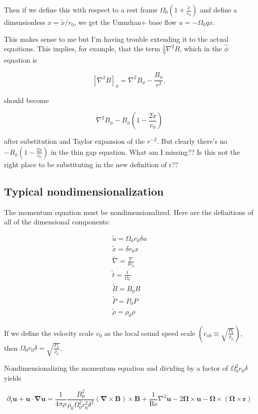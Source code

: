 \documentclass{paper}
\newcommand{\beq}{\begin{equation}}
\newcommand{\eeq}{\end{equation}}
\newcommand\reye{\mathrm{Re}}
\begin{document}
Then if we define this with respect to a rest frame $\Omega_0 \left(1 + \frac{\widetilde{x}}{r_0}\right)$ and define a dimensionless $x = \widetilde{x}/r_0$, we get the Umurhan+ base flow $u = - \Omega_0 q x$. 

This makes sense to me but I'm having trouble extending it to the actual equations. This implies, for example, that the term $\frac{1}{\eta} \nabla^2 B$, which in the $\hat{\phi}$ equation is

\beq
\left[\nabla^2 B\right]_\phi = \nabla^2 B_\phi - \frac{B_\phi}{r^2},
\eeq

should become 

\beq
\nabla^2 B_\phi - B_\phi \left(1 - \frac{2 \widetilde{x}}{r_0}\right)
\eeq

after substitution and Taylor expansion of the $r^{-2}$. But clearly there's no $- B_\phi \left(1 - \frac{2 \widetilde{x}}{r_0}\right)$ in the thin gap equation. What am I missing?? Is this not the right place to be substituting in the new definition of r??

\subsection{Typical nondimensionalization}
The momentum equation must be nondimensionalized. Here are the definitions of all of the dimensional components: 

\begin{equation}
\begin{multlined}
\widetilde{u} = \Omega_0 r_0 \delta u \\
\widetilde{x} = \delta r_0 x \\
\widetilde{\nabla} = \frac{\nabla}{\delta r_0}\\
\widetilde{t} = \frac{t}{\Omega_0}\\ 
\widetilde{B} = B_0 B \\
\widetilde{P} = P_0 P \\
\widetilde{\rho} = \rho_0 \rho 
\end{multlined}
\end{equation}

If we define the velocity scale $v_0$ as the local sound speed scale $\left(c_{s0} \equiv \sqrt{\frac{P_0}{\rho_0}}\right)$, then $\Omega_0 r_0 \delta = \sqrt{\frac{P_0}{\rho_0}}$.

Nondimensionalizing the momentum equation and dividing by a factor of $\Omega_0^2 r_0 \delta$ yields

\beq
\partial_t \mathbf{u} + \mathbf{u}\cdot \mathbf{\nabla} \mathbf{u} = \frac{1}{4 \pi \rho} \frac{B_0^2}{\rho_0 \Omega_0^2 r_0^2 \delta^2} (\mathbf{\nabla}\times\mathbf{B})\times\mathbf{B} + \frac{1}{\reye}\nabla^2 \mathbf{u} - 2 \mathbf{\Omega} \times \mathbf{u} - \mathbf{\Omega} \times (\mathbf{\Omega} \times \mathbf{r})
\eeq
\end{document}
